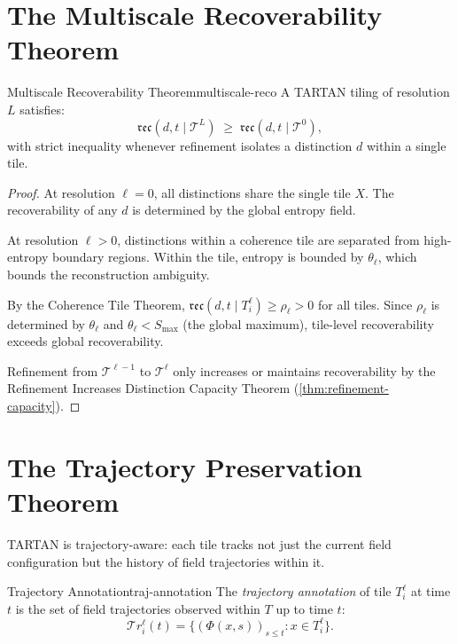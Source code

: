 \documentclass[12pt,twoside,openright]{book}
\newcommand{\reco}{\mathfrak{rec}}
\begin{document}
\section{The Multiscale Recoverability Theorem}

\begin{theorem}{Multiscale Recoverability Theorem}{multiscale-reco}
  A TARTAN tiling of resolution $L$ satisfies:
  \[
    \reco(d, t \mid \mathcal{T}^L)
    \;\ge\;
    \reco(d, t \mid \mathcal{T}^0),
  \]
  with strict inequality whenever refinement isolates
  a distinction $d$ within a single tile.
\end{theorem}

\begin{proof}
  At resolution $\ell = 0$, all distinctions share the
  single tile $X$. The recoverability of any $d$ is
  determined by the global entropy field.

  At resolution $\ell > 0$, distinctions within a
  coherence tile are separated from high-entropy
  boundary regions. Within the tile, entropy is
  bounded by $\theta_\ell$, which bounds the
  reconstruction ambiguity.

  By the Coherence Tile Theorem,
  $\reco(d, t \mid T^\ell_i) \ge \rho_\ell > 0$ for
  all tiles. Since $\rho_\ell$ is determined by
  $\theta_\ell$ and $\theta_\ell < S_{\max}$ (the
  global maximum), tile-level recoverability exceeds
  global recoverability.

  Refinement from $\mathcal{T}^{\ell-1}$ to
  $\mathcal{T}^\ell$ only increases or maintains
  recoverability by the Refinement Increases Distinction
  Capacity Theorem (\cref{thm:refinement-capacity}).
\end{proof}

\section{The Trajectory Preservation Theorem}

TARTAN is trajectory-aware: each tile tracks not just
the current field configuration but the history of
field trajectories within it.

\begin{definition}{Trajectory Annotation}{traj-annotation}
  The \emph{trajectory annotation} of tile $T^\ell_i$
  at time $t$ is the set of field trajectories
  observed within $T$ up to time $t$:
  \[
    \mathcal{T}\!r^\ell_i(t)
    = \{(\Phi(x,s))_{s \le t} : x \in T^\ell_i\}.
  \]
\end{definition}
\end{document}
